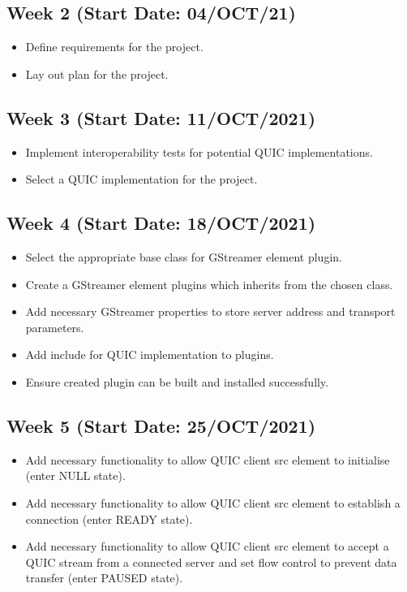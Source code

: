 \documentclass[11pt]{article}
\begin{document}
\subsection{Week 2 (Start Date: 04/OCT/21)}
\begin{itemize}
    \item Define requirements for the project.
    \item Lay out plan for the project.
\end{itemize}
\subsection{Week 3 (Start Date: 11/OCT/2021)}
\begin{itemize}
    \item Implement interoperability tests for potential QUIC implementations.
    \item Select a QUIC implementation for the project.
\end{itemize}
\subsection{Week 4 (Start Date: 18/OCT/2021)}
\begin{itemize}
    \item Select the appropriate base class for GStreamer element plugin.
    \item Create a GStreamer element plugins which inherits from the chosen class.
    \item Add necessary GStreamer properties to store server address and transport parameters.
    \item Add include for QUIC implementation to plugins.
    \item Ensure created plugin can be built and installed successfully.
\end{itemize}
\subsection{Week 5 (Start Date: 25/OCT/2021)}
\begin{itemize}
    \item Add necessary functionality to allow QUIC client src element to initialise (enter NULL state).
    \item Add necessary functionality to allow QUIC client src element to establish a connection (enter READY state).
    \item Add necessary functionality to allow QUIC client src element to accept a QUIC stream from a connected server and set flow control to prevent data transfer (enter PAUSED state).
\end{itemize}
\end{document}

